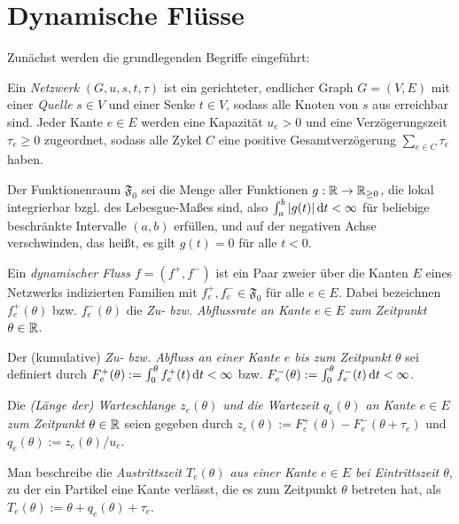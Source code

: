 \section{Dynamische Flüsse}\label{sec-dynamic-flows}

Zunächst werden die grundlegenden Begriffe eingeführt:

\begin{definition}[Netzwerk]
	Ein \emph{Netzwerk} $(G, u, s, t, \tau)$ ist ein gerichteter, endlicher Graph $G=(V,E)$ mit einer \emph{Quelle} $s\in V$ und einer Senke $t\in V$, sodass alle Knoten von $s$ aus erreichbar sind.
	Jeder Kante $e\in E$ werden eine Kapazität $u_e > 0$ und eine Verzögerungszeit $\tau_e\geq 0$ zugeordnet, sodass alle Zykel $C$ eine positive Gesamtverzögerung $\sum_{e\in C}\tau_e$ haben.
\end{definition}

\begin{definition}
	Der Funktionenraum $\mathfrak{F}_0$ sei die Menge aller Funktionen $g: \mathbb{R} \to \mathbb{R}_{\geq 0}$, die lokal integrierbar bzgl. des Lebesgue-Maßes sind, also $\int_a^b |g(t)| \mathop{}\!\mathrm{d} t< \infty$ für beliebige beschränkte Intervalle $(a,b)$ erfüllen, und auf der negativen Achse verschwinden, das heißt, es gilt $g(t)=0$ für alle $t<0$.
\end{definition}

\begin{definition}
	Ein \emph{dynamischer Fluss $f=(f^+, f^-)$} ist ein Paar zweier über die Kanten $E$ eines Netzwerks indizierten Familien mit $f^+_e,f^-_e\in\mathfrak F_0$ für alle $e\in E$.
	Dabei bezeichnen $f_e^+(\theta)$ bzw. $f_e^-(\theta)$ die \emph{Zu- bzw. Abflussrate an Kante $e\in E$ zum Zeitpunkt $\theta\in\mathbb{R}$}.
	
	Der (kumulative) \emph{Zu- bzw. Abfluss an einer Kante $e$ bis zum Zeitpunkt $\theta$} sei definiert durch $F^+_e(\theta):=\int_0^\theta f^+_e(t) \mathop{}\!\mathrm{d} t<\infty$ bzw. $F^-_e(\theta):=\int_0^\theta f^-_e(t) \mathop{}\!\mathrm{d} t<\infty$.
	
	Die \emph{(Länge der) Warteschlange $z_e(\theta)$ und die Wartezeit $q_e(\theta)$ an Kante $e\in E$ zum Zeitpunkt $\theta\in\mathbb{R}$} seien gegeben durch $z_e(\theta):= F_e^+(\theta) - F_e^-(\theta + \tau_e)$ und $q_e(\theta) := z_e(\theta) / u_e$.
	
	Man beschreibe die \emph{Austrittszeit $T_e(\theta)$ aus einer Kante $e\in E$ bei Eintrittszeit $\theta$}, zu der ein Partikel eine Kante verlässt, die es zum Zeitpunkt $\theta$ betreten hat, als $T_e(\theta):=\theta + q_e(\theta) + \tau_e$.
\end{definition}


